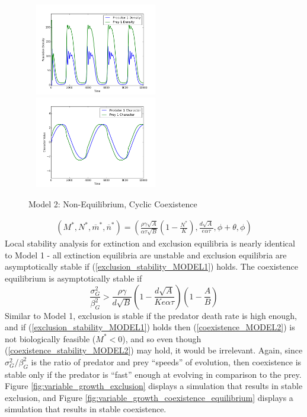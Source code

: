 \documentclass{amsart}
\theoremstyle{definition}
\theoremstyle{remark}
\numberwithin{equation}{section}
\begin{document}
\begin{centering}
\begin{figure}
		\includegraphics[width=6cm,height=4cm]{figures/1x1/variable_growth/stable_cycles/densities.png}
		\includegraphics[width=6cm,height=4cm]{figures/1x1/variable_growth/stable_cycles/traits.png}
		\caption{Model 2: Non-Equilibrium, Cyclic Coexistence}
		\label{fig:variable_growth_stable_cycles}
	\end{figure}
\end{centering}
\begin{equation}
	\label{coexistence_MODEL2}
	\begin{aligned}
		(M^*, N^*, \overline{m}^*, \overline{n}^*) = \left(\frac{\rho\gamma\sqrt{A}}{\alpha\tau\sqrt{B}}\left(1 - \frac{N^*}{K}\right), \frac{d\sqrt{A}}{e\alpha\tau}, \phi + \theta, \phi\right)
	\end{aligned}
\end{equation}
Local stability analysis for extinction and exclusion equilibria is nearly identical to Model 1 - all extinction equilibria are unstable and exclusion equilibria are asymptotically stable if (\ref{exclusion_stability_MODEL1}) holds.  The coexistence equilibrium is asymptotically stable if
\begin{equation}
	\label{coexistence_stability_MODEL2}
	\frac{\sigma_G^2}{\beta_G^2} > \frac{\rho\gamma}{d\sqrt{B}}\left(1 - \frac{d\sqrt{A}}{Ke\alpha\tau}\right)\left(1 - \frac{A}{B}\right)
\end{equation}
Similar to Model 1, exclusion is stable if the predator death rate is high enough, and if (\ref{exclusion_stability_MODEL1}) holds then (\ref{coexistence_MODEL2}) is not biologically feasible ($M^* < 0$), and so even though (\ref{coexistence_stability_MODEL2}) may hold, it would be irrelevant.  Again, since $\sigma_G^2/\beta_G^2$ is the ratio of predator and prey ``speeds'' of evolution, then coexistence is stable only if the predator is ``fast'' enough at evolving in comparison to the prey.  Figure \ref{fig:variable_growth_exclusion} displays a simulation that results in stable exclusion, and Figure \ref{fig:variable_growth_coexistence_equilibrium} displays a simulation that results in stable coexistence.
\end{document}
